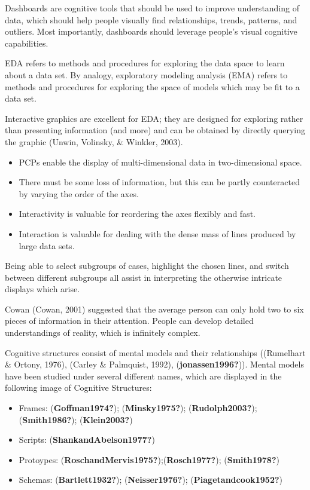 \documentclass[print]{nuthesis}
\providecommand{\tightlist}{%
  \setlength{\itemsep}{0pt}\setlength{\parskip}{0pt}}
\begin{document}
Dashboards are cognitive tools that should be used to improve understanding of data, which should help people visually find relationships, trends, patterns, and outliers. Most importantly, dashboards should leverage people's visual cognitive capabilities.

EDA refers to methods and procedures for exploring the data space to learn about a data set. By analogy, exploratory modeling analysis (EMA) refers to methods and procedures for exploring the space of models which may be fit to a data set.

Interactive graphics are excellent for EDA; they are designed for exploring rather than presenting information (and more) and can be obtained by directly querying the graphic (Unwin, Volinsky, \& Winkler, 2003).

\begin{itemize}
\tightlist
\item
  PCPs enable the display of multi-dimensional data in two-dimensional space.
\item
  There must be some loss of information, but this can be partly counteracted by varying the order of the axes.
\item
  Interactivity is valuable for reordering the axes flexibly and fast.
\item
  Interaction is valuable for dealing with the dense mass of lines produced by large data sets.
\end{itemize}

Being able to select subgroups of cases, highlight the chosen lines, and switch between different subgroups all assist in interpreting the otherwise intricate displays which arise.

Cowan (Cowan, 2001) suggested that the average person can only hold two to six pieces of information in their attention. People can develop detailed understandings of reality, which is infinitely complex.

Cognitive structures consist of mental models and their relationships ((Rumelhart \& Ortony, 1976), (Carley \& Palmquist, 1992), (\textbf{jonassen1996?})). Mental models have been studied under several different names, which are displayed in the following image of Cognitive Structures:

\begin{itemize}
\tightlist
\item
  Frames: (\textbf{Goffman1974?}); (\textbf{Minsky1975?}); (\textbf{Rudolph2003?}); (\textbf{Smith1986?}); (\textbf{Klein2003?})
\item
  Scripts: (\textbf{ShankandAbelson1977?})
\item
  Protoypes: (\textbf{RoschandMervis1975?});(\textbf{Rosch1977?}); (\textbf{Smith1978?})
\item
  Schemas: (\textbf{Bartlett1932?}); (\textbf{Neisser1976?}); (\textbf{Piagetandcook1952?})
\end{itemize}
\end{document}
